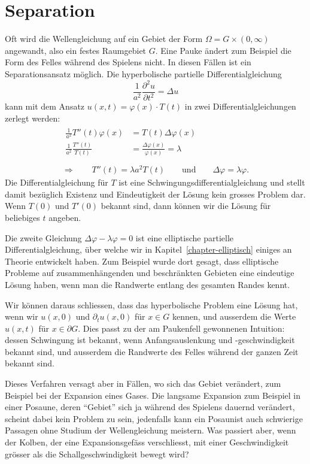 %
%
%
\section{Separation}
Oft wird die Wellengleichung auf ein Gebiet der Form
$\Omega = G\times(0,\infty)$ angewandt, also ein 
festes Raumgebiet $G$.
Eine Pauke ändert zum Beispiel die Form des Felles während des
Spielens nicht. In diesen Fällen ist ein Separationsansatz möglich.
Die hyperbolische partielle Differentialgleichung 
\[
\frac1{a^2}\frac{\partial^2 u}{\partial t^2}=\Delta u
\]
kann mit dem Ansatz $u(x,t)=\varphi(x)\cdot T(t)$ in zwei
Differentialgleichungen zerlegt werden:
\begin{gather*}
\begin{aligned}
\frac1{a^2}T''(t)\varphi(x)&=T(t)\Delta \varphi(x)\\
\frac1{a^2}\frac{T''(t)}{T(t)}&=\frac{\Delta\varphi(x)}{\varphi(x)}=\lambda\\
\end{aligned}
\\
\Rightarrow\qquad
T''(t)=\lambda a^2T(t)\qquad\text{und}\qquad\Delta \varphi=\lambda\varphi.
\end{gather*}
Die Differentialgleichung für $T$ ist eine Schwingungsdifferentialgleichung
und stellt damit bezüglich Existenz und Eindeutigkeit der Lösung
kein grosses Problem dar. Wenn $T(0)$ und $T'(0)$ bekannt sind, dann
können wir die Lösung für beliebiges $t$ angeben.

Die zweite Gleichung $\Delta \varphi-\lambda\varphi=0$ ist eine
elliptische partielle Differentialgleichung, über welche wir
in Kapitel~\ref{chapter-elliptisch} einiges an Theorie entwickelt haben.
Zum Beispiel wurde dort gesagt, dass elliptische Probleme auf
zusammenhängenden und beschränkten Gebieten eine eindeutige
Lösung haben, wenn man die Randwerte entlang des gesamten Randes
kennt.

Wir können daraus schliessen, dass das hyperbolische Problem eine
Lösung hat, wenn wir $u(x,0)$ und $\partial_tu(x,0)$ für
$x\in G$ kennen, und ausserdem die Werte $u(x,t)$ für $x\in\partial G$.
Dies passt zu der am Paukenfell gewonnenen Intuition: dessen Schwingung
ist bekannt, wenn Anfangsauslenkung und -geschwindigkeit bekannt sind,
und ausserdem die Randwerte des Felles während der ganzen Zeit
bekannt sind.

Dieses Verfahren versagt aber in Fällen, wo sich das Gebiet verändert,
zum Beispiel bei der Expansion eines Gases.
Die langsame Expansion zum Beispiel in einer Posaune, deren ``Gebiet''
sich ja während des Spielens dauernd verändert, scheint dabei kein
Problem zu sein, jedenfalls kann ein Posaunist auch schwierige Passagen
ohne Studium der Wellengleichung meistern.
Was passiert aber, wenn der
Kolben, der eine Expansionsgefäss verschliesst, mit einer Geschwindigkeit
grösser als die Schallgeschwindigkeit bewegt wird? 

